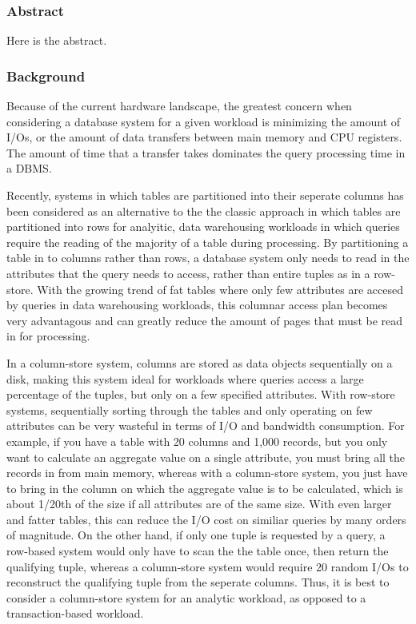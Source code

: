 

\subsubsection*{Abstract}
Here is the abstract.


\subsubsection*{Background}


 


Because of the current hardware landscape, the greatest concern when considering a database system for a given workload is minimizing the amount of I/Os, or the amount of data transfers between main memory and CPU registers. The amount of time that a transfer takes dominates the query processing time in a DBMS. 


Recently, systems in which tables are partitioned into their seperate columns has been considered as an alternative to the the classic approach in which tables are partitioned into rows for analyitic, data warehousing workloads in which queries require the reading of the majority of a table during processing\cite{columnOverview}. By partitioning a table in to columns rather than rows, a database system only needs to read in the attributes that the query needs to access, rather than entire tuples as in a row-store. With the growing trend of fat tables where only few attributes are accesed by queries in data warehousing workloads, this columnar access plan becomes very advantagous and can greatly reduce the amount of pages that must be read in for processing\cite{now}.


In a column-store system, columns are stored as data objects sequentially on a disk, making this system ideal for workloads where queries access a large percentage of the tuples, but only on a few specified attributes\cite{now}. With row-store systems, sequentially sorting through the tables and only operating on few attributes can be very wasteful in terms of I/O and bandwidth consumption. For example, if you have a table with 20 columns and 1,000 records, but you only want to calculate an aggregate value on a single attribute, you must bring all the records in from main memory, whereas with a column-store system, you just have to bring in the column on which the aggregate value is to be calculated, which is about 1/20th of the size if all attributes are of the same size. With even larger and fatter tables, this can reduce the I/O cost on similiar queries by many orders of magnitude. On the other hand, if only one tuple is requested by a query, a row-based system would only have to scan the the table once, then return the qualifying tuple, whereas a column-store system would require 20 random I/Os to reconstruct the qualifying tuple from the seperate columns. Thus, it is best to consider a column-store system for an analytic workload, as opposed to a transaction-based workload. 


